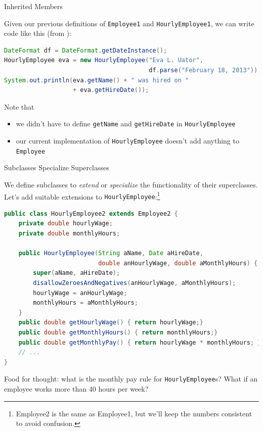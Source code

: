 \documentclass{beamer}
\begin{document}
\begin{frame}[fragile]{Inherited Members}


Given our previous definitions of {\tt Employee1} and {\tt HourlyEmployee1}, we can write code like this (from ):
\begin{lstlisting}[language=Java]
DateFormat df = DateFormat.getDateInstance();
HourlyEmployee eva = new HourlyEmployee("Eva L. Uator",
                                        df.parse("February 18, 2013"));
System.out.println(eva.getName() + " was hired on " 
                   + eva.getHireDate());
\end{lstlisting}
Note that
\begin{itemize}
\item we didn't have to define {\tt getName} and {\tt getHireDate} in {\tt HourlyEmployee}
\item our current implementation of {\tt HourlyEmployee} doesn't add anything to {\tt Employee}
\end{itemize}


\end{frame}

\begin{frame}[fragile]{Subclasses Specialize Superclasses}


We define subclasses to {\it extend} or {\it specialize} the functionality of their superclasses.  Let's add suitable extensions to {\tt HourlyEmployee}:\footnote{Employee2 is the same as Employee1, but we'll keep the numbers consistent to avoid confusion.}
\vspace{-.05in}
\begin{lstlisting}[language=Java]
public class HourlyEmployee2 extends Employee2 {
    private double hourlyWage;
    private double monthlyHours;

    public HourlyEmployee(String aName, Date aHireDate,
                          double anHourlyWage, double aMonthlyHours) {
        super(aName, aHireDate);
        disallowZeroesAndNegatives(anHourlyWage, aMonthlyHours);
        hourlyWage = anHourlyWage;
        monthlyHours = aMonthlyHours;
    }
    public double getHourlyWage() { return hourlyWage;}
    public double getMonthlyHours() { return monthlyHours;}
    public double getMonthlyPay() { return hourlyWage * monthlyHours; }
    // ...
}
\end{lstlisting}
\vspace{-.1in}
Food for thought: what is the monthly pay rule for {\tt HourlyEmployee}s?  What if an employee works more than 40 hours per week?
\end{frame}
\end{document}
